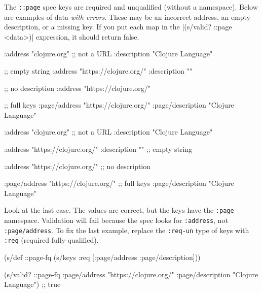 The \verb|::page| spec keys are required and unqualified (without a namespace). Below are examples of data \emph{with errors}. These may be an incorrect address, an empty description, or a missing key. If you put each map in the \spverb|(s/valid? ::page <data>)| expression, it should return false.

\ifx\DEVICETYPE\MOBILE

\begin{english}
  \begin{clojure}
{:address "clojure.org" ;; not a URL
 :description "Clojure Language"}

;; empty string
{:address "https://clojure.org/"
 :description ""}

;; no description
{:address "https://clojure.org/"}

 ;; full keys
{:page/address "https://clojure.org/"
 :page/description "Clojure Language"}
  \end{clojure}
\end{english}

\else

\begin{english}
  \begin{clojure}
{:address "clojure.org" ;; not a URL
 :description "Clojure Language"}

{:address "https://clojure.org/"
 :description ""} ;; empty string

{:address "https://clojure.org/"} ;; no description

{:page/address "https://clojure.org/" ;; full keys
 :page/description "Clojure Language"}
  \end{clojure}
\end{english}

\fi

Look at the last case. The values are correct, but the keys have the \verb|:page| namespace. Validation will fail because the spec looks for \verb|:address|, not \verb|:page/address|. To fix the last example, replace the \verb|:req-un| type of keys with \verb|:req| (required fully-qualified).


\ifx\DEVICETYPE\MOBILE

\begin{english}
  \begin{clojure}
(s/def ::page-fq
  (s/keys :req [:page/address
                :page/description]))

(s/valid? ::page-fq
  {:page/address "https://clojure.org/"
   :page/description "Clojure Language"})
;; true
  \end{clojure}
\end{english}

